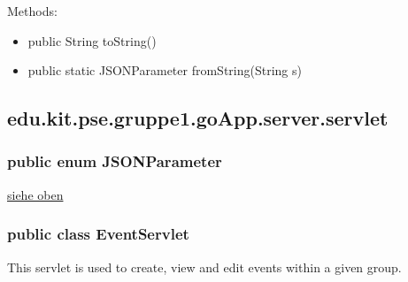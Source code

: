 Methods:
\begin{itemize}
	\item public String toString()
		
	\item public static JSONParameter fromString(String s)
\end{itemize}

\hypertarget{Servlets}{}
	\subsection{edu.kit.pse.gruppe1.goApp.server.servlet}
	\subsubsection{public enum JSONParameter}
	\hyperlink{JSONParameter}{siehe oben}
\subsubsection{public class EventServlet}
This servlet is used to create, view and edit events within a given group.

